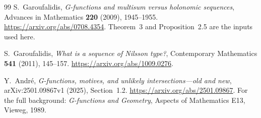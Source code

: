 \documentclass[11pt,a4paper]{article}
\numberwithin{equation}{section}
\theoremstyle{definition}
\theoremstyle{remark}
\theoremstyle{definition}
\theoremstyle{plain}
\begin{document}
\begin{thebibliography}{99}
S.~Garoufalidis, \emph{G-functions and multisum versus holonomic sequences},
Advances in Mathematics \textbf{220} (2009), 1945--1955.
\url{https://arxiv.org/abs/0708.4354}.
Theorem~3 and Proposition~2.5 are the inputs used here.

S.~Garoufalidis, \emph{What is a sequence of Nilsson type?},
Contemporary Mathematics \textbf{541} (2011), 145--157.
\url{https://arxiv.org/abs/1009.0276}.

Y.~Andr\'e, \emph{G-functions, motives, and unlikely intersections---old
and new}, arXiv:2501.09867v1 (2025), Section~1.2.
\url{https://arxiv.org/abs/2501.09867}.
For the full background: \emph{G-functions and Geometry},
Aspects of Mathematics E13, Vieweg, 1989.
\end{thebibliography}
\end{document}
